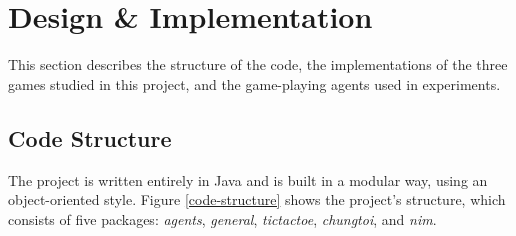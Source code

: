 \documentclass[11pt,a4paper,twoside,openright]{report}
\begin{document}
\chapter{Design \& Implementation}
\label{sec:DesignImpl}

This section describes the structure of the code, the implementations of the three games studied in this project, and the game-playing agents used in experiments.


\section{Code Structure}
\label{sec:code-structure}

The project is written entirely in Java and is built in a modular way, using an object-oriented style. Figure \ref{code-structure} shows the project's structure, which consists of five packages: \emph{agents}, \emph{general}, \emph{tictactoe}, \emph{chungtoi}, and \emph{nim}.
\end{document}
